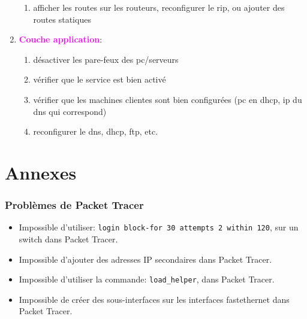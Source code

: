\documentclass[a4paper]{article}
\begin{document}
\begin{enumerate}
\begin{enumerate}
        \item afficher les routes sur les routeurs, reconfigurer le rip, ou ajouter des routes statiques
    \end{enumerate}
    \item \textcolor{magenta}{\textbf{Couche application}}:
    \begin{enumerate}
        \item désactiver les pare-feux des pc/serveurs
        \item vérifier que le service est bien activé
        \item vérifier que les machines clientes sont bien configurées (pc en dhcp, ip du dns qui correspond)
        \item reconfigurer le dns, dhcp, ftp, etc.
    \end{enumerate}
\end{enumerate}















\part{Annexes}










\section{Problèmes de Packet Tracer}



\begin{itemize}
    \item Impossible d'utiliser: \texttt{login block-for 30 attempts 2 within 120}, sur un switch dans Packet Tracer.
    \item Impossible d'ajouter des adresses IP secondaires dans Packet Tracer.
    \item Impossible d'utiliser la commande: \texttt{load\_helper}, dans Packet Tracer.
    \item Impossible de créer des sous-interfaces sur les interfaces fastethernet dans Packet Tracer.
\end{itemize}
\end{document}

